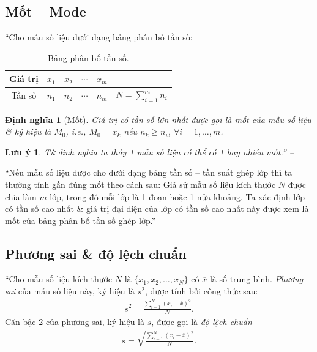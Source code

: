 \documentclass[oneside]{book}
\numberwithin{equation}{section}
\newtheorem{dinhnghia}{Định nghĩa}[section]
\newtheorem{luuy}{Lưu ý}[section]
\begin{document}
\subsection{Mốt -- Mode}
``Cho mẫu số liệu dưới dạng bảng phân bố tần số:

\begin{table}[H]
	\centering
	\begin{tabular}{|c|c|c|c|c|c|}
		\hline
		Giá trị & $x_1$ & $x_2$ & $\cdots$ &  $x_m$ &  \\
		\hline
		Tần số & $n_1$ & $n_2$ & $\cdots$ & $n_m$ & $N = \sum_{i=1}^m n_i$ \\
		\hline
	\end{tabular}
	\caption{Bảng phân bố tần số.}
	\label{tab:bang phan bo tan so}
\end{table}

\begin{dinhnghia}[Mốt]
	Giá trị có tần số lớn nhất được gọi là \emph{mốt} của mẫu số liệu \& ký hiệu là $M_0$, i.e., $M_0 = x_k$ nếu $n_k\ge n_i$, $\forall i = 1,\ldots,m$.
\end{dinhnghia}

\begin{luuy}
	Từ đinh nghĩa ta thấy 1 mẫu số liệu có thể có 1 hay nhiều mốt.'' -- \cite[p. 73]{TL_chuyen_Toan_Dai_So_Giai_Tich_11}
\end{luuy}
``Nếu mẫu số liệu được cho dưới dạng bảng tần số -- tần suất ghép lớp thì ta thường tính gần đúng mốt theo cách sau: Giả sử mẫu số liệu kích thước $N$ được chia làm $m$ lớp, trong đó mỗi lớp là 1 đoạn hoặc 1 nửa khoảng. Ta xác định lớp có tần số cao nhất \& giá trị đại diện của lớp có tần số cao nhất này được xem là mốt của bảng phân bố tần số ghép lớp.'' -- \cite[p. 74]{TL_chuyen_Toan_Dai_So_Giai_Tich_11}

\subsection{Phương sai \& độ lệch chuẩn}
``Cho mẫu số liệu kích thước $N$ là $\{x_1,x_2,\ldots,x_N\}$ có $\overline{x}$ là số trung bình. \textit{Phương sai} của mẫu số liệu này, ký hiệu là $s^2$, được tính bởi công thức sau:
\begin{align}
	\label{phuong sai}
	s^2 = \frac{\sum_{i=1}^N \left(x_i - \overline{x}\right)^2}{N}.
\end{align}
Căn bậc 2 của phương sai, ký hiệu là $s$, được gọi là \textit{độ lệch chuẩn}
\begin{align}
	\label{do lech chuan}
	s = \sqrt{\frac{\sum_{i=1}^N \left(x_i - \overline{x}\right)^2}{N}}.
\end{align}
\end{document}
